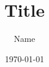 \documentclass[11pt, thmnum, eqsecnum, allcites, dark]{mathbeamer}
\title[Subtitle]{Title}
\author{Name}
\date{\today}
\institute[SUSTech]{Southern University of Science and Technology}
\begin{document}
\initclock


\end{document}

